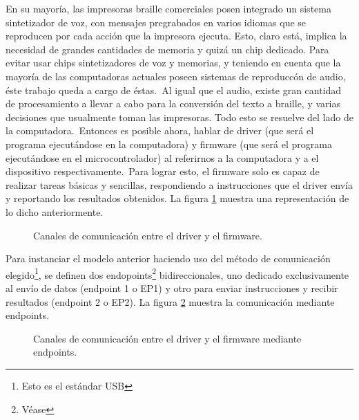 En su mayor\'ia, las impresoras braille comerciales posen integrado un sistema
sintetizador de voz, con mensajes pregrabados en varios idiomas que se
reproducen por cada acci\'on que la impresora ejecuta. Esto, claro est\'a,
implica la necesidad de grandes cantidades de memoria y quiz\'a un chip
dedicado. Para evitar usar chips sintetizadores de voz y memorias, y
teniendo en cuenta que la mayor\'ia de las computadoras actuales poseen
sistemas
de reproducc\'on de audio, \'este trabajo queda a cargo de \'estas.\
Al igual que el audio, existe gran cantidad de procesamiento a llevar a cabo
para la conversi\'on del texto a braille, y varias decisiones que usualmente
toman las impresoras. Todo esto se resuelve del lado de la computadora.\
Entonces es posible ahora, hablar de driver (que ser\'a el programa
ejecut\'andose en la computadora) y firmware (que ser\'a el programa
ejecut\'andose
en el microcontrolador) al referirnos a la computadora y a el dispositivo
respectivamente.\
Para lograr esto, el firmware solo es capaz de realizar tareas b\'asicas y
sencillas, respondiendo a instrucciones que el driver env\'ia y reportando los
resultados obtenidos. La figura \ref{fig:driver_firmware} muestra una
representaci\'on de lo dicho anteriormente.\\

\begin{figure}[htp]
\centering
{}
\caption{Canales de comunicaci\'on entre el driver y el firmware.}
\label{fig:driver_firmware}
\end{figure}


Para instanciar el modelo anterior haciendo uso del m\'etodo de comunicaci\'on
elegido\footnote{Esto es el est\'andar USB}, se definen dos
endopoints\footnote{V\'ease } bidireccionales, uno
dedicado exclusivamente al env\'io de datos (endpoint 1 o EP1) y otro para
enviar
instrucciones y recibir resultados (endpoint 2 o EP2). La figura
\ref{fig:driver_eps_firmware} muestra la comunicaci\'on mediante endpoints.


\begin{figure}[htp]
\centering
{}
\caption{Canales de comunicaci\'on entre el driver y el firmware mediante
endpoints.}
\label{fig:driver_eps_firmware}
\end{figure}

